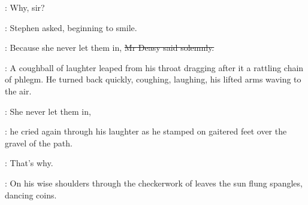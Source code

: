 \Stephen:
Why, sir?

:
Stephen asked, beginning to smile.

\deasy:
Because she never let them in,
\sout{Mr Deasy said solemnly.}

:
A coughball of laughter leaped from his throat
dragging after it a rattling chain of phlegm.
He turned back quickly, coughing, laughing,
his lifted arms waving to the air.

\deasy:
She never let them in,

:
he cried again through his laughter
as he stamped on gaitered feet over the gravel of the path.

\deasy:
That's why.

:
On his wise shoulders through the checkerwork of leaves
the sun flung spangles, dancing coins.

